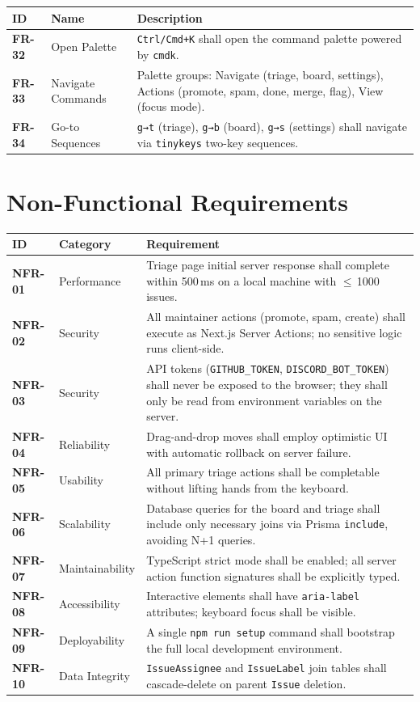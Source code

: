 \documentclass[12pt,a4paper]{report}
\begin{document}
\begin{longtable}{>{\bfseries}p{1.8cm} p{4.5cm} p{6.5cm}}
\toprule
ID & Name & Description \\
\midrule
\endhead
FR-32 & Open Palette & \texttt{Ctrl/Cmd+K} shall open the command palette
  powered by \texttt{cmdk}. \\
FR-33 & Navigate Commands & Palette groups: Navigate (triage, board, settings),
  Actions (promote, spam, done, merge, flag), View (focus mode). \\
FR-34 & Go-to Sequences & \texttt{g→t} (triage), \texttt{g→b} (board),
  \texttt{g→s} (settings) shall navigate via
  \texttt{tinykeys} two-key sequences. \\
\bottomrule
\end{longtable}

\section{Non-Functional Requirements}

\begin{longtable}{>{\bfseries}p{2cm} p{4cm} p{7cm}}
\toprule
ID & Category & Requirement \\
\midrule
\endhead
NFR-01 & Performance & Triage page initial server response shall complete within
  500\,ms on a local machine with $\leq$\,1000 issues. \\
NFR-02 & Security & All maintainer actions (promote, spam, create) shall
  execute as Next.js Server Actions; no sensitive logic runs client-side. \\
NFR-03 & Security & API tokens (\texttt{GITHUB\_TOKEN},
  \texttt{DISCORD\_BOT\_TOKEN}) shall never be exposed to the browser; they
  shall only be read from environment variables on the server. \\
NFR-04 & Reliability & Drag-and-drop moves shall employ optimistic UI with
  automatic rollback on server failure. \\
NFR-05 & Usability & All primary triage actions shall be completable without
  lifting hands from the keyboard. \\
NFR-06 & Scalability & Database queries for the board and triage shall include
  only necessary joins via Prisma \texttt{include}, avoiding N+1 queries. \\
NFR-07 & Maintainability & TypeScript strict mode shall be enabled; all server
  action function signatures shall be explicitly typed. \\
NFR-08 & Accessibility & Interactive elements shall have \texttt{aria-label}
  attributes; keyboard focus shall be visible. \\
NFR-09 & Deployability & A single \texttt{npm run setup} command shall
  bootstrap the full local development environment. \\
NFR-10 & Data Integrity & \texttt{IssueAssignee} and \texttt{IssueLabel} join
  tables shall cascade-delete on parent \texttt{Issue} deletion. \\
\bottomrule
\end{longtable}
\end{document}
